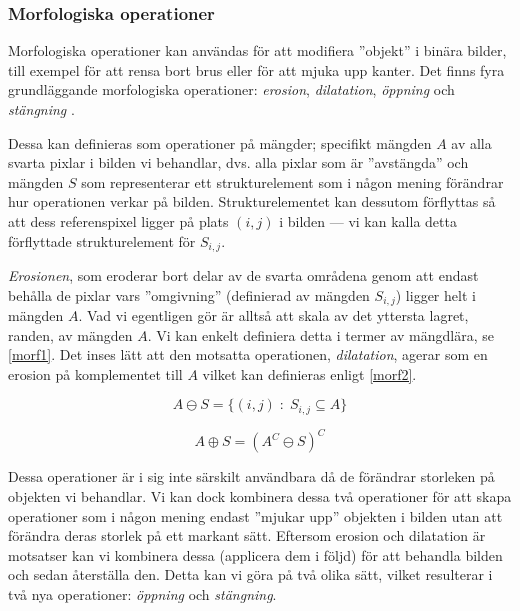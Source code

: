 \documentclass[../rapport_MVEX01-11-05]{subfiles}
\begin{document}
\subsubsection{Morfologiska operationer}


Morfologiska operationer kan användas för att modifiera ''objekt'' i
binära bilder, till exempel för att rensa bort brus eller för att
mjuka upp kanter. Det finns fyra grundläggande morfologiska
operationer: \emph{erosion}, \emph{dilatation}, \emph{öppning} och
\emph{stängning} \cite[ss.~25]{Rudemo09}.

Dessa kan definieras som operationer på mängder; specifikt mängden $A$
av alla svarta pixlar i bilden vi behandlar, dvs. alla pixlar som är
''avstängda'' och mängden $S$ som representerar ett strukturelement
som i någon mening förändrar hur operationen verkar på bilden.
Strukturelementet kan dessutom förflyttas så att dess referenspixel
ligger på plats $(i,j)$ i bilden --- vi kan kalla detta förflyttade
strukturelement för $S_{i,j}$.

\emph{Erosionen}, som eroderar bort delar av de svarta områdena genom
att endast behålla de pixlar vars ''omgivning'' (definierad av mängden
$S_{i,j}$) ligger helt i mängden $A$. Vad vi egentligen gör är alltså
att skala av det yttersta lagret, randen, av mängden $A$. Vi kan
enkelt definiera detta i termer av mängdlära, se \eqref{morf1}. Det
inses lätt att den motsatta operationen, \emph{dilatation}, agerar som
en erosion på komplementet till $A$ vilket kan definieras enligt
\eqref{morf2}.

\begin{equation}
  \label{morf1}
  A\ominus S = \{(i,j)\;:\;S_{i,j}\subseteq A\}
\end{equation}

\begin{equation}
  \label{morf2}
  A\oplus S = (A^C\ominus S)^C
\end{equation}

Dessa operationer är i sig inte särskilt användbara då de förändrar
storleken på objekten vi behandlar. Vi kan dock kombinera dessa två
operationer för att skapa operationer som i någon mening endast 
''mjukar upp'' objekten i bilden utan att förändra deras storlek på
ett markant sätt. Eftersom erosion och dilatation är motsatser kan vi
kombinera dessa (applicera dem i följd) för att behandla bilden och
sedan återställa den. Detta kan vi göra på två olika sätt, vilket
resulterar i två nya operationer: \emph{öppning} och \emph{stängning}.
\end{document}
